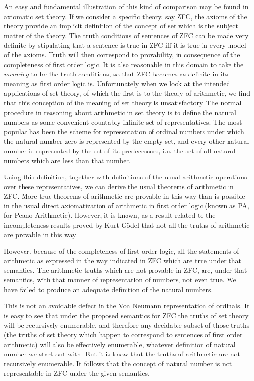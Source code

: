 An easy and fundamental illustration of this kind of comparison may be
found in axiomatic set theory.
If we consider a specific theory. say ZFC, the axioms of
the theory provide an implicit definition of the concept of set which
is the subject matter of the theory.
The truth conditions of sentences of ZFC can be made very definite by stipulating
that a sentence is true in ZFC iff it is true in every model of the axioms.
Truth will then correspond to provability, in consequence of the
completeness of first order logic.
It is also reasonable in this domain to take the \emph{meaning} to be
the truth conditions, so that ZFC becomes as definite in its meaning
as first order logic is.
Unfortunately when we look at the intended applications of set theory,
of which the first is to the theory of arithmetic, we find that this
conception of the meaning of set theory is unsatisfactory.
The normal procedure in reasoning about arithmetic in set theory is to
define the natural numbers as some convenient countably infinite set
of representatives.
The most popular has been the scheme for representation of ordinal
numbers under which the natural number zero is represented by the
empty set, and every other natural number is represented by the set of
its predecessors, i.e. the set of all natural numbers which are less
than that number.

Using this definition, together with definitions of the usual
arithmetic operations over these representatives, we can derive the
usual theorems of arithmetic in ZFC.
More true theorems of arithmetic are provable in this way than is
possible in the usual direct axiomatization of arithmetic in first
order logic (known as PA, for Peano Arithmetic).
However, it is known, as a result related to the incompleteness
results proved by Kurt G\"odel that not all the
truths of arithmetic are provable in this way.

However, because of the completeness of first order logic, all the
statements of arithmetic as expressed in the way indicated in ZFC
which are true under that semantics.
The arithmetic truths which are not provable in ZFC, are, under
that semantics, with that manner of representation of numbers, not
even true.
We have failed to produce an adequate definition of the natural
numbers.

This is not an avoidable defect in the Von Neumann
representation of ordinals.
It is easy to see that under the proposed semantics for ZFC the truths
of set theory will be recursively enumerable, and therefore any
decidable subset of those truths (the truths of set theory which
happen to correspond to sentences of first order arithmetic) will also
be effectively enumerable, whatever definition of natural number we
start out with.
But it is know that the truths of arithmetic are not recursively
enumerable.
It follows that the concept of natural number is not representable in
ZFC under the given semantics.

